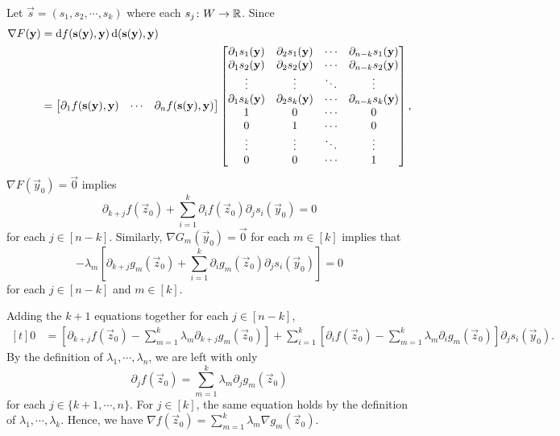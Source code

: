 \documentclass[../MAS242_Note.tex]{subfiles}
\begin{document}
{    Let \(\vec{s} = (s_1, s_2, \cdots, s_k)\) where each \(s_j \colon W \to \RR\).
    Since
    \[\begin{aligned}[t]
        \nabla F(\mathbf{y}) &= \mathrm{d}f(\mathbf{s}(\mathbf{y}), \mathbf{y})\,\mathrm{d}(\mathbf{s}(\mathbf{y}), \mathbf{y}) \\
        &= \begin{bmatrix}
            \partial_1 f(\mathbf{s}(\mathbf{y}), \mathbf{y}) & \cdots & \partial_n f(\mathbf{s}(\mathbf{y}), \mathbf{y})
        \end{bmatrix} \begin{bmatrix}
            \partial_1 s_1(\mathbf{y}) & \partial_2 s_1(\mathbf{y}) & \cdots & \partial_{n-k} s_1(\mathbf{y}) \\
            \partial_1 s_2(\mathbf{y}) & \partial_2 s_2(\mathbf{y}) & \cdots & \partial_{n-k} s_2(\mathbf{y}) \\
            \vdots & \vdots & \ddots & \vdots \\
            \partial_1 s_{k}(\mathbf{y}) & \partial_2 s_{k}(\mathbf{y}) & \cdots & \partial_{n-k} s_{k}(\mathbf{y}) \\
            1 & 0 & \cdots & 0 \\
            0 & 1 & \cdots & 0 \\
            \vdots & \vdots & \ddots & \vdots \\
            0 & 0 & \cdots & 1
        \end{bmatrix},
    \end{aligned}\]
    \(\nabla F(\vec{y}_0) = \vec{0}\) implies
    \[
        \partial_{k+j} f(\vec{z}_0)
        + \sum_{i=1}^{k} \partial_i f(\vec{z}_0) \partial_j s_i(\vec{y}_0) = 0
    \]
    for each \(j \in [n-k]\).
    Similarly, \(\nabla G_m(\vec{y}_0) = \vec{0}\) for each \(m \in [k]\) implies that
    \[
        -\lambda_m \left[ \partial_{k+j} g_m(\vec{z}_0)
        + \sum_{i=1}^{k} \partial_i g_m(\vec{z}_0) \partial_j s_i(\vec{y}_0)\right] = 0
    \]
    for each \(j \in [n - k]\) and \(m \in [k]\).

    Adding the \(k + 1\) equations together for each \(j \in [n - k]\),
    \[\begin{aligned}[t]
        0 &= \left[ \partial_{k+j} f(\vec{z}_0) - \sum_{m=1}^{k} \lambda_m \partial_{k+j} g_m(\vec{z}_0) \right]
        + \sum_{i=1}^{k} \left[
            \partial_i f(\vec{z}_0)
            - \sum_{m=1}^{k} \lambda_m \partial_i g_m(\vec{z}_0)
        \right] \partial_j s_i(\vec{y}_0).
    \end{aligned}\]
    By the definition of \(\lambda_1, \cdots, \lambda_n\),
    we are left with only
    \[
        \partial_{j} f(\vec{z}_0) = \sum_{m=1}^{k} \lambda_m \partial_{j} g_m(\vec{z}_0)
    \]
    for each \(j \in \{k+1, \cdots, n\}\).
    For \(j \in [k]\), the same equation holds by the definition of \(\lambda_1, \cdots, \lambda_k\).
    Hence, we have \(\nabla f(\vec{z}_0) = \sum_{m=1}^{k} \lambda_m \nabla g_m(\vec{z}_0)\).
}
\end{document}
